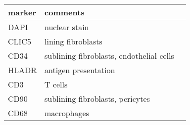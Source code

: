 \begin{tabular}{lll}
\toprule
\bfseries marker & \bfseries comments &  \\
\midrule
DAPI & nuclear stain &  \\
CLIC5 & lining fibroblasts &  \\
CD34 & sublining fibroblasts, endothelial cells &  \\
HLADR & antigen presentation &  \\
CD3 & T cells &  \\
CD90 & sublining fibroblasts, pericytes &  \\
CD68 & macrophages &  \\
\bottomrule
\end{tabular}
